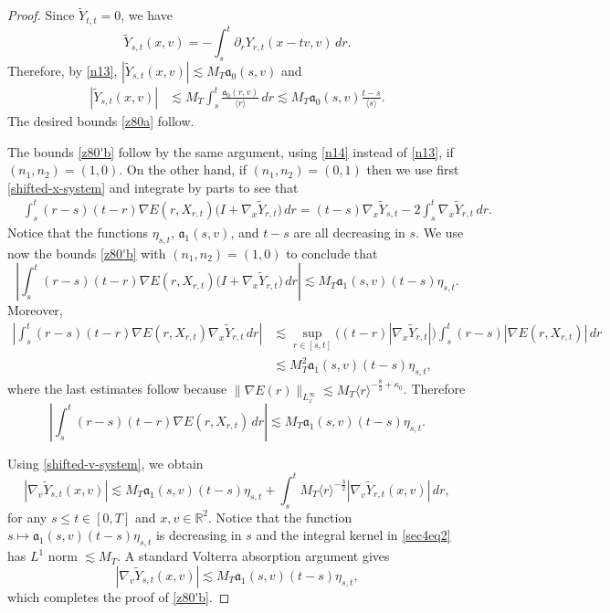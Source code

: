 \documentclass[reqno,11pt]{amsart}
\numberwithin{equation}{section}
\def\R{{\mathbb R}}
\def\R{{\bf R}}
\def\R{\mathbb{R}}
\begin{document}
\begin{proof}  Since $\widetilde Y_{t,t}=0$, we have
	\begin{equation*}
		\widetilde Y_{s,t}(x,v)=-\int_s^t\partial_rY_{r,t}(x-tv,v)\,dr.
	\end{equation*}
	Therefore, by \eqref{n13},	$|\widetilde Y_{s,t}(x,v)|\lesssim M_T\mathfrak a_0(s,v)$ and
	\begin{align*}
|\widetilde Y_{s,t}(x,v)|
		&\lesssim M_T\int_s^t\frac{\mathfrak a_0(r,v)}{\langle r\rangle}\,dr
		\lesssim M_T\mathfrak a_0(s,v)\frac{t-s}{\langle s\rangle}.
	\end{align*}
The desired bounds \eqref{z80a} follow. 

The bounds \eqref{z80'b} follow by the same argument, using \eqref{n14} instead of \eqref{n13}, if $(n_1,n_2)=(1,0)$. On the other hand, if $(n_1,n_2)=(0,1)$ then we use first \eqref{shifted-x-system} and integrate by parts to see that
\begin{align*}
&\int_s^t(r-s)(t-r)\nabla E(r,X_{r,t})
\big(I+\nabla_x\widetilde Y_{r,t}\big)\,dr=(t-s)\nabla_x\widetilde Y_{s,t}-2\int_s^t\nabla_x\widetilde Y_{r,t}\,dr.
\end{align*}
Notice that the functions $\eta_{s,t}$, $\mathfrak{a}_1(s,v)$, and $t-s$ are all decreasing in $s$. We use now the bounds \eqref{z80'b} with $(n_1,n_2)=(1,0)$ to conclude that
\[
\left|\int_s^t(r-s)(t-r)\nabla E(r,X_{r,t})\big(I+\nabla_x\widetilde Y_{r,t}\big)\,dr\right|\lesssim M_T\mathfrak a_1(s,v)(t-s)\eta_{s,t}.
\]
Moreover,
\begin{align*}
\left|\int_s^t(r-s)(t-r)\nabla E(r,X_{r,t})\nabla_x\widetilde Y_{r,t}\,dr\right|&\lesssim
\sup_{r\in[s,t]}\big((t-r)|\nabla_x\widetilde Y_{r,t}|\big)\int_s^t(r-s)|\nabla E(r,X_{r,t})|\,dr\\
&\lesssim M_T^2\mathfrak a_1(s,v)(t-s)\eta_{s,t},
\end{align*}
where the last estimates follow because $\|\nabla E(r)\|_{L^\infty_x}\lesssim M_T\langle r\rangle^{-\frac83+\kappa_0}$. Therefore
\begin{equation}\label{sec4eq1}
\left|\int_s^t(r-s)(t-r)\nabla E(r,X_{r,t})\,dr\right|\lesssim M_T\mathfrak a_1(s,v)(t-s)\eta_{s,t}.
\end{equation}

Using \eqref{shifted-v-system}, we obtain
\begin{equation}\label{sec4eq2}
|\nabla_v\widetilde Y_{s,t}(x,v)|\lesssim M_T\mathfrak a_1(s,v)(t-s)\eta_{s,t}+\int_s^tM_T\langle r\rangle^{-\frac32}|\nabla_v\widetilde Y_{r,t}(x,v)|\,dr,
\end{equation}
for any $s\leq t\in[0,T]$ and $x,v\in\R^2$. Notice that the function 
\(
s\mapsto
\mathfrak a_1(s,v)(t-s)\eta_{s,t}
\)
is decreasing in $s$  and the integral kernel in \eqref{sec4eq2} has $L^1$ norm $\lesssim M_T$. A standard Volterra absorption argument gives
\[
|\nabla_v\widetilde Y_{s,t}(x,v)|\lesssim M_T\mathfrak a_1(s,v)(t-s)\eta_{s,t},
\]
which completes the proof of \eqref{z80'b}.


\end{proof}
\end{document}
